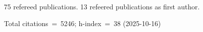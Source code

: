 75 refereed publications. 13 refeered publications as first author.

Total citations~=~5246; h-index~=~38 (2025-10-16)